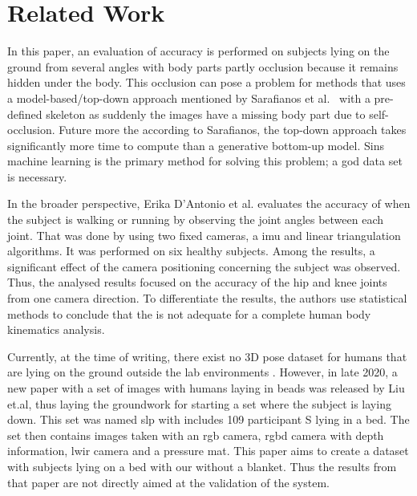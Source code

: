 \section{Related Work}
\label{sec:related_work}
In this paper, an evaluation of accuracy is performed on subjects lying on the ground from several angles with body parts partly occlusion because it remains hidden under the body.
This occlusion can pose a problem for methods that uses a model-based/top-down approach mentioned by Sarafianos et al.~\cite{sarafianos2016} with a pre-defined skeleton as suddenly the images have a missing body part due to self-occlusion.
Future more the according to Sarafianos, the top-down approach takes significantly more time to compute than a generative bottom-up model.
Sins machine learning is the primary method for solving this problem; a god data set is necessary.

In the broader perspective, Erika D’Antonio et al. \cite{d2021validation} evaluates the accuracy of \openposeS when the subject is walking or running by observing the joint angles between each joint.
That was done by using two fixed cameras, a \ac{imu} and linear triangulation algorithms. It was performed on six healthy subjects.
Among the results, a significant effect of the camera positioning concerning the subject was observed.
Thus, the analysed results focused on the accuracy of the hip and knee joints from one camera direction.
To differentiate the results, the authors use statistical methods to conclude that the \operpose{ } is not adequate for a complete human body kinematics analysis.

Currently, at the time of writing, there exist no 3D pose dataset for humans that are lying on the ground outside the lab environments \cite{yang2018, mehta2017, yasin2016, wang2019}.
However, in late 2020, a new paper with a set of images with humans laying in beads was released by Liu et.al\cite{liu2020simultaneously}, thus laying the groundwork for starting a set where the subject is laying down.
This set was named \ac{slp} with includes 109 participant S lying in a bed.
The set then contains images taken with an \ac{rgb} camera, \ac{rgbd} camera with depth information, \ac{lwir} camera and a pressure mat.
This paper aims to create a dataset with subjects lying on a bed with our without a blanket.
Thus the results from that paper are not directly aimed at the validation of the system.

